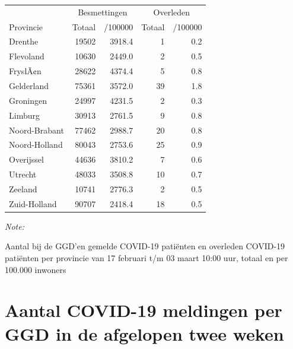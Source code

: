 \documentclass[
  english,
  man,floatsintext]{apa6}
\begin{document}
\begin{table}
\centering
\begin{threeparttable}
\begin{tabular}{lrrrr}
\toprule
\multicolumn{1}{c}{ } & \multicolumn{2}{c}{Besmettingen} & \multicolumn{2}{c}{Overleden} \\
\cmidrule(l{3pt}r{3pt}){2-3} \cmidrule(l{3pt}r{3pt}){4-5}
Provincie & Totaal & /100000 & Totaal & /100000\\
\midrule
Drenthe & 19502 & 3918.4 & 1 & 0.2\\
Flevoland & 10630 & 2449.0 & 2 & 0.5\\
FryslÃ¢n & 28622 & 4374.4 & 5 & 0.8\\
Gelderland & 75361 & 3572.0 & 39 & 1.8\\
Groningen & 24997 & 4231.5 & 2 & 0.3\\
Limburg & 30913 & 2761.5 & 9 & 0.8\\
Noord-Brabant & 77462 & 2988.7 & 20 & 0.8\\
Noord-Holland & 80043 & 2753.6 & 25 & 0.9\\
Overijssel & 44636 & 3810.2 & 7 & 0.6\\
Utrecht & 48033 & 3508.8 & 10 & 0.7\\
Zeeland & 10741 & 2776.3 & 2 & 0.5\\
Zuid-Holland & 90707 & 2418.4 & 18 & 0.5\\
\bottomrule
\end{tabular}
\begin{tablenotes}
\item \textit{Note: } 
\item Aantal bij de GGD’en gemelde COVID-19 patiënten en overleden COVID-19 patiënten per provincie van 17 februari t/m 03 maart 10:00 uur, totaal en per 100.000 inwoners
\end{tablenotes}
\end{threeparttable}
\end{table}

\newpage

\hypertarget{aantal-covid-19-meldingen-per-ggd-in-de-afgelopen-twee-weken}{%
\section{Aantal COVID-19 meldingen per GGD in de afgelopen twee weken}\label{aantal-covid-19-meldingen-per-ggd-in-de-afgelopen-twee-weken}}
\end{document}
